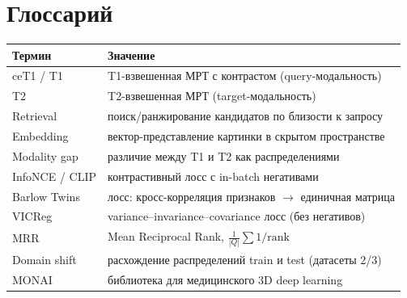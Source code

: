 \documentclass[11pt,a4paper]{article}
\begin{document}
\section{Глоссарий}
\begin{center}\small
\begin{tabularx}{\linewidth}{@{}l X@{}}\toprule
\textbf{Термин} & \textbf{Значение}\\\midrule
ceT1 / T1 & T1-взвешенная МРТ с контрастом (query-модальность)\\
T2 & T2-взвешенная МРТ (target-модальность)\\
Retrieval & поиск/ранжирование кандидатов по близости к запросу\\
Embedding & вектор-представление картинки в скрытом пространстве\\
Modality gap & различие между T1 и T2 как распределениями\\
InfoNCE / CLIP & контрастивный лосс с in-batch негативами\\
Barlow Twins & лосс: кросс-корреляция признаков $\to$ единичная матрица\\
VICReg & variance--invariance--covariance лосс (без негативов)\\
MRR & Mean Reciprocal Rank, $\frac1{|Q|}\sum 1/\text{rank}$\\
Domain shift & расхождение распределений train и test (датасеты 2/3)\\
MONAI & библиотека для медицинского 3D deep learning\\
\bottomrule\end{tabularx}\end{center}
\end{document}
